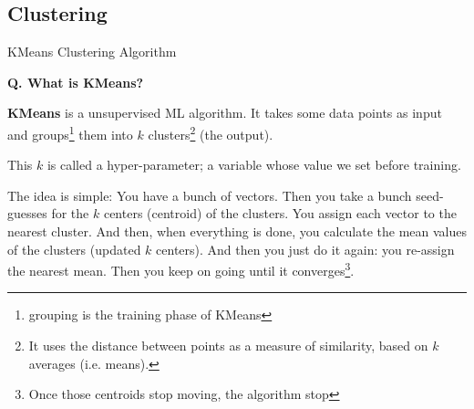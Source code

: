
\subsection{Clustering}
\begin{transitionsubframe}
  \begin{center}
    \Huge KMeans Clustering Algorithm
  \end{center}
\end{transitionsubframe}


\begin{frame}[fragile]{\textbf{Q. What is KMeans?}}
  \begin{wideitemize}
  \item \textbf{KMeans} is a unsupervised ML algorithm. It takes some data points
  as input and groups\footnote{grouping is the training phase of KMeans} them into $k$
  clusters\footnote{It uses the distance between points as a measure of similarity,
  based on $k$ averages (i.e. means).} (the output).\medskip
  \begin{wideitemize}
    \item This $k$ is called a hyper-parameter; a variable whose value we set before training.
    \item The idea is simple: You have a bunch of vectors. Then you take a bunch seed-guesses for the
    $k$ centers (centroid) of the clusters. You assign each vector to the nearest cluster. And then,
    when everything is done, you calculate the mean values of the clusters (updated $k$ centers).
    And then you just do it again: you re-assign the nearest mean. Then you keep on going
    until it converges\footnote{Once those centroids stop moving, the algorithm stop}.
  \end{wideitemize}
  \end{wideitemize}
\end{frame}

